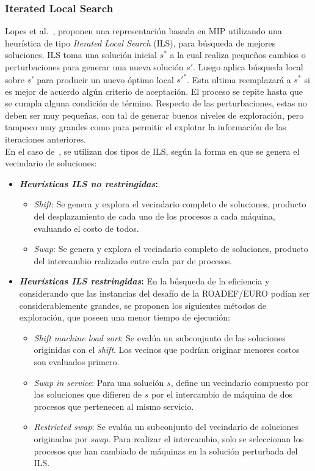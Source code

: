 \documentclass[../informe2.tex]{subfiles}
\begin{document}
\subsubsection{Iterated Local Search}
Lopes et al.~\cite{lopes2015heuristics}, proponen una representación basada en MIP utilizando una heurística de tipo \textit{Iterated Local Search} (ILS), para búsqueda de mejores soluciones. ILS toma una solución inicial $s^{*}$ a la cual realiza pequeños cambios o perturbaciones para generar una nueva solución $s'$. Luego aplica búsqueda local sobre $s'$ para producir un nuevo óptimo local ${s'}^{*}$. Esta ultima reemplazará a $s^{*}$  si es mejor de acuerdo algún criterio de aceptación. El proceso se repite hasta que se cumpla alguna condición de término. Respecto de las perturbaciones, estas no deben ser muy pequeñas, con tal de generar buenos niveles de exploración, pero tampoco muy grandes como para permitir el explotar la información de las iteraciones anteriores. \\
En el caso de~\cite{lopes2015heuristics}, se utilizan dos tipos de ILS, según la forma en que se genera el vecindario de soluciones:
\begin{itemize}
	\item \textbf{\textit{Heurísticas ILS no restringidas}:}
		\begin{itemize}
			\item \textit{Shift}: Se genera y explora el vecindario completo de soluciones, producto del desplazamiento de cada uno de los procesos a cada máquina, evaluando el costo de todos.
			\item \textit{Swap}: Se genera y explora el vecindario completo de soluciones, producto del intercambio realizado entre cada par de procesos.
		\end{itemize}
	\item \textbf{\textit{Heurísticas ILS restringidas}:} En la búsqueda de la eficiencia y considerando que las instancias del desafío de la ROADEF/EURO podían ser considerablemente grandes, se proponen los siguientes métodos de exploración, que poseen una menor tiempo de ejecución:
		\begin{itemize}
			\item \textit{Shift machine load sort}: Se evalúa un subconjunto de las soluciones originidas con el \emph{shift}. Los vecinos que podrían originar menores costos son evaluados primero.
			\item \textit{Swap in service}:	Para una solución $s$, define un vecindario compuesto por las soluciones que difieren de $s$ por el intercambio de máquina de dos procesos que pertenecen al mismo servicio.
			\item \textit{Restricted swap}: Se evalúa un subconjunto del vecindario de soluciones originadas por \emph{swap}. Para realizar el intercambio, solo se seleccionan los procesos que han cambiado de máquinas en la solución perturbada del ILS.
		\end{itemize}
\end{itemize}
\end{document}
